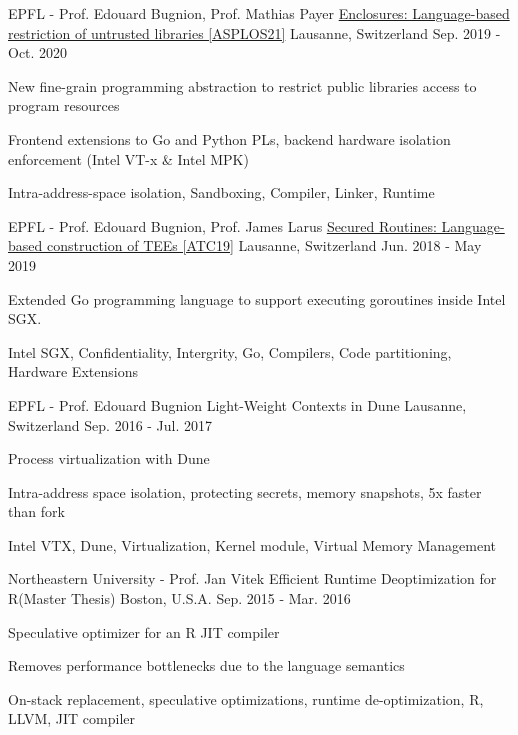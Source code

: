 \begin{cventries}
\cventry
{EPFL - Prof. Edouard Bugnion, Prof. Mathias Payer}
  {\href{https://aghosn.github.io/assets/pdf/enclosure_aghosn.pdf}{Enclosures: Language-based restriction of untrusted libraries [ASPLOS21]}}
{Lausanne, Switzerland}
{Sep. 2019  - Oct. 2020}
{
	\begin{cvitems}
  \item{New fine-grain programming abstraction to restrict public libraries access to program resources}
  \item{Frontend extensions to Go and Python PLs, backend hardware isolation enforcement (Intel VT-x \& Intel MPK)}
  \item{Intra-address-space isolation, Sandboxing, Compiler, Linker, Runtime}
	\end{cvitems}
}

\cventry
{EPFL - Prof. Edouard Bugnion, Prof. James Larus}
  {\href{https://www.usenix.org/system/files/atc19-ghosn_0.pdf}{Secured Routines: Language-based construction of TEEs [ATC19]}}
{Lausanne, Switzerland}
{Jun. 2018  - May 2019}
{
	\begin{cvitems}
  \item{Extended Go programming language to  support executing goroutines inside Intel SGX.}
	\item{Intel SGX, Confidentiality, Intergrity, Go, Compilers, Code partitioning, Hardware Extensions}
	\end{cvitems}
}

\cventry
{EPFL - Prof. Edouard Bugnion}
{Light-Weight Contexts in Dune}
{Lausanne, Switzerland}
{Sep. 2016 - Jul. 2017}
{
	\begin{cvitems}
  \item{Process virtualization with Dune}
  \item{Intra-address space isolation, protecting secrets, memory snapshots, 5x faster than fork}
	\item{Intel VTX, Dune, Virtualization, Kernel module, Virtual Memory Management}
	\end{cvitems}
}

\cventry
{Northeastern University - Prof. Jan Vitek} %
{Efficient Runtime Deoptimization for R(Master Thesis)} %
{Boston, U.S.A.} %
{Sep. 2015 - Mar. 2016} %
{ %
\begin{cvitems}
\item{Speculative optimizer for an R JIT compiler}
\item{Removes performance bottlenecks due to the language semantics}
\item {On-stack replacement, speculative optimizations, runtime de-optimization, R, LLVM, JIT compiler}
\end{cvitems}
}


\end{cventries}
